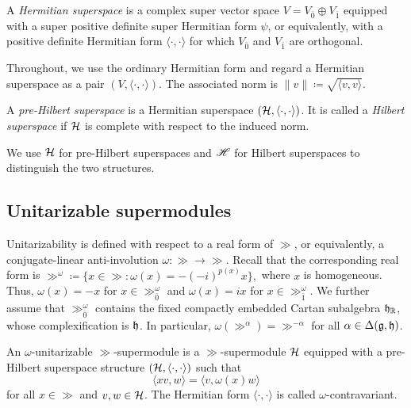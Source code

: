 \begin{definition}
A \emph{Hermitian superspace} is a complex super vector space $V=V_{\bar0}\oplus V_{\bar1}$ equipped with a super positive definite super Hermitian form $\psi$, or equivalently, with a positive definite Hermitian form $\langle\cdot,\cdot\rangle$ for which $V_{\bar0}$ and $V_{\bar1}$ are orthogonal.
\end{definition}

Throughout, we use the ordinary Hermitian form and regard a Hermitian superspace as a pair $(V,\langle\cdot,\cdot\rangle)$. The associated norm is
$
\|v\|\coloneqq\sqrt{\langle v,v\rangle}.
$

\begin{definition}
A \emph{pre-Hilbert superspace} is a Hermitian superspace $({\mathcal{H}},\langle\cdot,\cdot\rangle)$. It is called a \emph{Hilbert superspace} if ${\mathcal{H}}$ is complete with respect to the induced norm.
\end{definition}

We use ${\mathcal{H}}$ for pre-Hilbert superspaces and ${\mathscr{H}}$ for Hilbert superspaces to distinguish the two structures.

\subsection{Unitarizable supermodules}

Unitarizability is defined with respect to a real form of $\gg$, or equivalently, a conjugate-linear anti-involution $\omega:\gg\to\gg$. Recall that the corresponding real form is
$
\gg^\omega\coloneqq\{x\in\gg:\omega(x)=-(-i)^{p(x)}x\},
$
where $x$ is homogeneous. Thus, $\omega(x)=-x$ for $x\in\gg^\omega_{\bar0}$ and $\omega(x)=ix$ for $x\in\gg^\omega_{\bar1}$. We further assume that $\gg^\omega_{\bar0}$ contains the fixed compactly embedded Cartan subalgebra ${\mathfrak h}_{{\mathbb R}}$, whose complexification is ${\mathfrak h}$. In particular, $\omega(\gg^{\alpha})=\gg^{-\alpha}$ for all $\alpha \in \Delta({\mathfrak{g}},{\mathfrak h})$.  

\begin{definition}
An $\omega$-unitarizable $\gg$-supermodule is a $\gg$-supermodule ${\mathcal{H}}$ equipped with a pre-Hilbert superspace structure $({\mathcal{H}},\langle\cdot,\cdot\rangle)$ such that
\begin{equation*}
\langle xv,w\rangle=\langle v,\omega(x)w\rangle
\end{equation*}
for all $x\in\gg$ and $v,w\in{\mathcal{H}}$. The Hermitian form $\langle\cdot,\cdot\rangle$ is called $\omega$-contravariant.
\end{definition}

